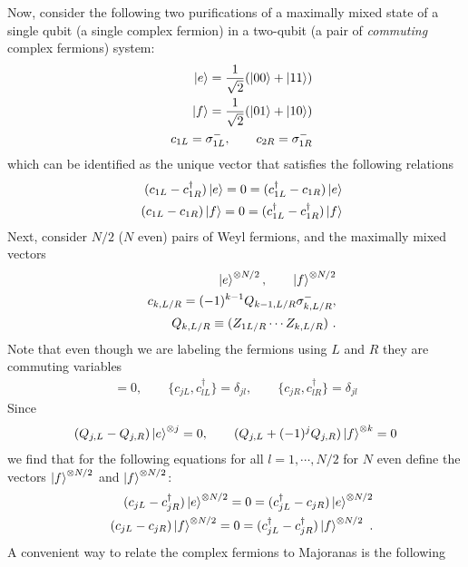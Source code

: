 \documentclass{article}
\theoremstyle{definition}
\newcommand{\nn}{\nonumber}
\begin{document}
    Now, consider the following two purifications of a maximally mixed state of a
    single qubit (a single complex fermion) in a two-qubit (a pair of
    {\it commuting} complex fermions) system:
    \begin{eqnarray}
        &&\ket{e}=\frac{1}{\sqrt{2}}(\ket{00}+\ket{11})\nn\\
        &&\ket{f}=\frac{1}{\sqrt{2}}(\ket{01}+\ket{10})\nn\\
        &&c_{1L}=\sigma_{1L}^-,\qquad c_{2R}=\sigma_{1R}^-
    \end{eqnarray}
    which can be identified as the unique vector that satisfies the following
    relations
    \begin{eqnarray}
        &&(c_{1L}-c_{1R}^\dagger)\ket{e}=0=(c_{1L}^\dagger-c_{1R})\ket{e}\nn\\
        &&(c_{1L}-c_{1R})\ket{f}=0=(c_{1L}^\dagger-c_{1R}^\dagger)\ket{f}
    \end{eqnarray}
    Next, consider $N/2$ ($N$ even) pairs of Weyl fermions, and the maximally
    mixed vectors
    \begin{eqnarray}
        &&\ket{e}^{\otimes N/2},\qquad \ket{f}^{\otimes N/2}\nn\\
        &&c_{k,L/R}=(-1)^{k-1}Q_{k-1,L/R}\sigma_{k,L/R}^-,\nn\\
        &&Q_{k,L/R}\equiv (Z_{1L/R}\cdots Z_{k,L/R})\ .
    \end{eqnarray}
    Note that even though we are labeling the fermions using $L$ and $R$ they
    are commuting variables
    \begin{eqnarray}
        [c_{jL},c^\dagger_{l,R}]=0,\qquad \{c_{jL},c^\dagger_{lL}\}=\delta_{jl},\qquad
        \{c_{jR},c^\dagger_{lR}\}=\delta_{jl}
    \end{eqnarray}
    Since
    \begin{eqnarray}
        (Q_{j,L}-Q_{j,R})\ket{e}^{\otimes j}=0,\qquad (Q_{j,L}+(-1)^jQ_{j,R})\ket{f}^{\otimes k}=0
    \end{eqnarray}
    we find that for the following equations for all $l=1,\cdots, N/2$ for $N$
    even define the vectors $\ket{f}^{\otimes N/2}$ and $\ket{f}^{\otimes N/2}$:
    \begin{eqnarray}
        &&(c_{jL}-c_{jR}^\dagger)\ket{e}^{\otimes N/2}=0=(c_{jL}^\dagger-c_{jR})\ket{e}^{\otimes N/2}\nn\\
        &&(c_{jL}-c_{jR})\ket{f}^{\otimes N/2}=0=(c_{j L}^\dagger-c_{j R}^\dagger)\ket{f}^{\otimes N/2}\ .
    \end{eqnarray}
    A convenient way to relate the complex fermions to Majoranas is the following
\end{document}
